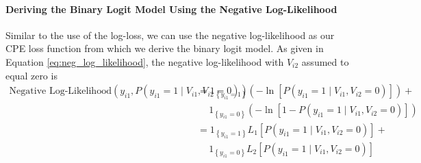 \paragraph{Deriving the Binary Logit Model Using the Negative Log-Likelihood} Similar to the use of the log-loss, we can use the negative log-likelihood as our CPE loss function from which we derive the binary logit model. As given in Equation \ref{eq:neg_log_likelihood}, the negative log-likelihood with $V_{i2}$ assumed to equal zero is 
\begin{equation*}
\begin{aligned}
\textrm{Negative Log-Likelihood}\left(y_{i1},  P \left( y_{i1} = 1 \mid V_{i1}, V_{i2} = 0 \right) \right) &= 1_{\left\lbrace y_{i1} = 1 \right\rbrace} \left( - \ln \left[ P \left( y_{i1} = 1 \mid V_{i1}, V_{i2} = 0 \right) \right] \right) +\\
&\quad \  1_{\left\lbrace y_{i1} = 0 \right\rbrace} \left( - \ln \left[ 1 - P \left( y_{i1} = 1 \mid V_{i1}, V_{i2} = 0 \right) \right] \right) \\
&=  1_{\left\lbrace y_{i1} = 1 \right\rbrace} L_1 \left[ P \left( y_{i1} = 1 \mid V_{i1}, V_{i2} = 0 \right) \right] +\\
& \quad \ 1_{\left\lbrace y_{i1} = 0 \right\rbrace} L_2 \left[ P \left( y_{i1} = 1 \mid V_{i1}, V_{i2} = 0 \right) \right]
\end{aligned}
\end{equation*}

